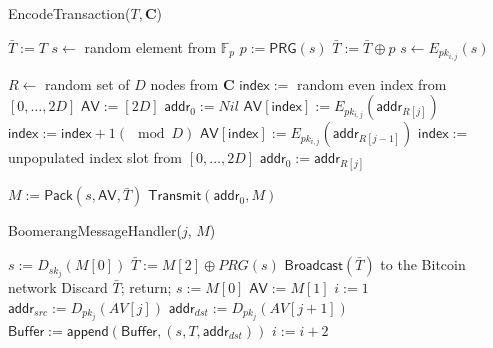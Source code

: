 \begin{algorithm}[t!]
\caption{{\sf EncodeTransaction}($T, \mathbf{C}$)}
\label{alg:encode}
\begin{algorithmic}[1]

	\State $\bar{T} := T$
	\State $s \gets $ random element from $\mathbb{F}_p$
		\State $p := \mathsf{PRG}(s)$
		\State $\bar{T} := \bar{T} \oplus p$
		\State $s \gets E_{pk_{i,j}}(s)$
	\EndFor

	\State $R \gets$ random set of $D$ nodes from $\mathbf{C}$
	\State $\mathsf{index} :=$ random even index from $[0,\dots,2D]$ %
	\State $\mathsf{AV} := [2D]$ %
	\State $\mathsf{addr}_0 := Nil$
		\State $\mathsf{AV}[\mathsf{index}] := E_{pk_{i,j}}(\mathsf{addr}_{R[j]})$
		\State $\mathsf{index} := \mathsf{index} + 1 (\mod D)$
		\State $\mathsf{AV}[\mathsf{index}] := E_{pk_{i,j}}(\mathsf{addr}_{R[j-1]})$
		\State $\mathsf{index} :=$ unpopulated index slot from $[0,\dots,2D]$
		\State $\mathsf{addr}_0 := \mathsf{addr}_{R[j]}$
	\EndFor

	\State $M := \mathsf{Pack}(s, \mathsf{AV}, \bar{T})$
	\State $\mathsf{\mathsf{Transmit}}(\mathsf{addr}_0, M)$
\EndFor

\end{algorithmic}
\end{algorithm}

\begin{algorithm}[t!]
\caption{{\sf BoomerangMessageHandler}($j$, $M$)}
\label{alg:handler}
\begin{algorithmic}[1]

\State $s := D_{sk_{j}}(M[0])$
\State $\bar{T} := M[2] \oplus PRG(s)$
	\State $\mathsf{Broadcast}(\bar{T})$ to the Bitcoin network
	\State Discard $\bar{T}$; return;
\Else
	\State $s := M[0]$
	\State $\mathsf{AV} := M[1]$
	\State $i := 1$
		\State $\mathsf{addr}_{src} := D_{pk_j}(AV[j])$
			\State $\mathsf{addr}_{dst} := D_{pk_j}(AV[j + 1])$
			\State $\mathsf{Buffer} := \mathsf{append}(\mathsf{Buffer}, (s, T, \mathsf{addr}_{dst}))$
		\Else
			\State $i := i + 2$
		\EndIf
	\EndWhile
\EndIf

\end{algorithmic}
\end{algorithm}

